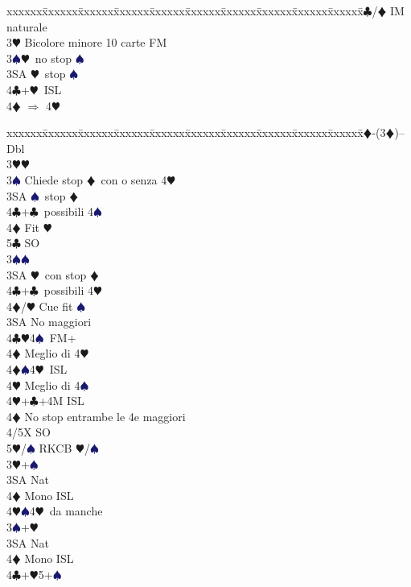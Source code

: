 \documentclass[a4paper,italian]{article}
\newcommand{\BC}{\textcolor{OliveGreen}{$\clubsuit$}}
\newcommand{\BD}{\textcolor{RedOrange}{$\vardiamondsuit$}}
\newcommand{\BH}{\textcolor{Red2}{$\varheartsuit${}}}
\newcommand{\BS}{\textcolor{MidnightBlue}{$\spadesuit${}}}
\newenvironment{bidtable}
{\begin{tabbing}

    xxxxxx\=xxxxxx\=xxxxxx\=xxxxxx\=xxxxxx\=xxxxxx\=xxxxxx\=xxxxxx\=xxxxxx\=xxxxxx\=\kill}
{\end{tabbing} }%
\begin{document}
\begin{multicols}{2}
\begin{bidtable}
        3\BC/\BD \> IM naturale\\
        3\BH \> Bicolore minore 10 carte FM\\
        3\BS {}\BH\ no stop \BS \\
        3SA \BH\ stop \BS \\
        4\BC {}+\BH\ ISL\\
        4\BD \> $\Rightarrow$ 4\BH \-
    \end{bidtable}
    \begin{bidtable}
        2\BD-(3\BD)--\+\\
        Dbl\+\\
        3\BH {}\BH \+\\
        3\BS \> Chiede stop \BD\ con o senza 4\BH\\
        3SA \BS\ stop \BD\\
        4\BC {}+\BC\ possibili 4\BS\\
        4\BD \> Fit \BH \\
        5\BC \> SO\-\\
        3\BS {}\BS \+\\
        3SA \BH\ con stop \BD\\
        4\BC {}+\BC\ possibili 4\BH\\
        4\BD/\BH \> Cue fit \BS \-\\
        3SA \> No maggiori\+\\
        4\BC {}\BH 4\BS\ FM+\+\\
        4\BD \> Meglio di 4\BH \-\\
        4\BD {}\BS 4\BH\ ISL\+\\
        4\BH \> Meglio di 4\BS \-\\
        4\BH {}+\BC +4M ISL\-\\
        4\BD\> No stop entrambe le 4e maggiori\+\\
        4/5X \> SO\\
        5\BH/\BS\> RKCB \BH/\BS\-\\
        3\BH {}+\BS \+\\
        3SA \> Nat\+\\
        4\BD \> Mono ISL\\
        4\BH {}\BS 4\BH\ da manche\-\-\\
        3\BS {}+\BH \+\\
        3SA \> Nat\+\\
        4\BD \> Mono ISL\-\-\\
        4\BC {}+\BH5+\BS\\

\end{bidtable}
\end{multicols}
\end{document}
